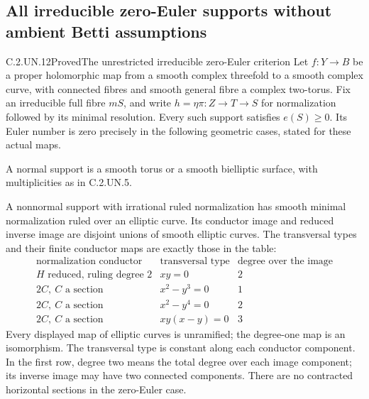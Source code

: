 \subsection{All irreducible zero-Euler supports without ambient Betti assumptions}

\begin{statement}{C.2.UN.12}{Proved}{The unrestricted irreducible zero-Euler criterion}
Let $f:Y\to B$ be a proper holomorphic map from a smooth
complex threefold to a smooth complex curve, with connected
fibres and smooth general fibre a complex two-torus. Fix an
irreducible full fibre $mS$, and write
$h=\eta\pi:Z\to T\to S$ for normalization followed by its
minimal resolution. Every such support satisfies $e(S)\ge0$.
Its Euler number is zero precisely in the following geometric
cases, stated for these actual maps.

A normal support is a smooth torus or a smooth bielliptic
surface, with multiplicities as in C.2.UN.5.

A nonnormal support with irrational ruled normalization has
smooth minimal normalization ruled over an elliptic curve.
Its conductor image and reduced inverse image are disjoint
unions of smooth elliptic curves. The transversal types and
their finite conductor maps are exactly those in the table:
\[
\begin{array}{c|c|c}
 \text{normalization conductor}&\text{transversal type}
       &\text{degree over the image}\\ \hline
 H\text{ reduced, ruling degree }2&xy=0&2\\
 2C,\ C\text{ a section}&x^2-y^3=0&1\\
 2C,\ C\text{ a section}&x^2-y^4=0&2\\
 2C,\ C\text{ a section}&xy(x-y)=0&3
\end{array}                                                   \tag{C.IZ.1}
\]
Every displayed map of elliptic curves is unramified; the
degree-one map is an isomorphism. The transversal type is
constant along each conductor component. In the first row,
degree two means the total degree over each image component;
its inverse image may have two connected components. There are no
contracted horizontal sections in the zero-Euler case.


\end{statement}
